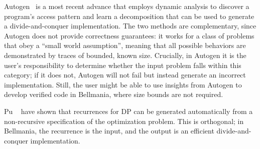 Autogen~\cite{PPoPP16/Chowdhury} is a most recent advance that employs dynamic analysis to discover
a program's access pattern and learn a decomposition that can be used to generate a divide-and-conquer
implementation. The two methods are complementary, since Autogen does not provide correctness guarantees:
it works for a class of problems that obey a ``small world assumption'', meaning that all possible behaviors are demonstrated by traces of bounded, known size.
Crucially, in Autogen it is the user's responsibility to determine whether the input problem falls within this category;
if it does not, Autogen will not fail but instead generate an incorrect implementation.
Still, the user might be able to use insights from Autogen to develop verified code in Bellmania,
where size bounds are not required.

Pu \etal{}~\cite{OOPSLA11/Pu} have shown that recurrences for DP can be generated automatically from a non-recursive specification of the optimization problem.
This is orthogonal; in Bellmania, the recurrence is the input, and the output is an efficient divide-and-conquer implementation.

\begin{comment}
Our ``$\big/$'' operator can be compared to the separating disjunction ``$\ast$'' of Separation Logic~\cite{LICS02/Reynolds},
used to frame parts of the dynamic heap (which can be thought of as one large array),
in particular while checking that a program only accesses the parts allocated to it in its precondition.
While $\ast$ has the semantics of an existentially quantified predicate, Bellmania uses type qualifiers
to explicitly specify a formula defining each part. In this sense, it is more closely related to
Region Logic~\cite{ECOOP08/Banerjee}. These formulas make encoding in first-order logic straightforward,
and the use of Liquid Types allows for any number of dimensions and for decidable checking of domain inclusion
and disjointness.
\end{comment}